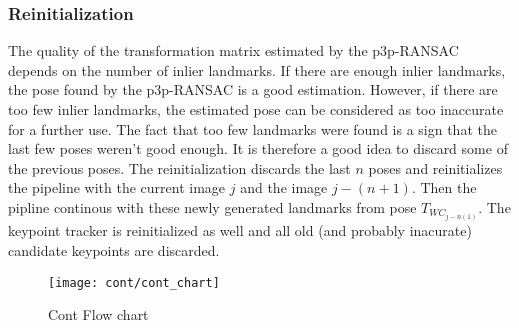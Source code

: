\subsubsection{Reinitialization}
The quality of the transformation matrix estimated by the p3p-RANSAC depends on the number of inlier landmarks. If there are enough inlier landmarks, the pose found by the p3p-RANSAC is a good estimation. However, if there are too few inlier landmarks, the estimated pose can be considered as too inaccurate for a further use. The fact that too few landmarks were found is a sign that the last few poses weren't good enough. It is therefore a good idea to discard some of the previous poses. The reinitialization discards the last \begin{math} n \end{math} poses and reinitializes the pipeline with the current image \begin{math} j \end{math} and the image \begin{math} j-(n+1) \end{math}. Then the pipline continous with these newly generated landmarks from pose $T_{WC_{j-n(1)}}$. The keypoint tracker is reinitialized as well and all old (and probably inacurate) candidate keypoints are discarded.

\begin{figure}[ht]
	\centering
	\texttt{[image: cont/cont\_chart]}
	\caption{Cont Flow chart}
	\label{img_flow_cont}
\end{figure}